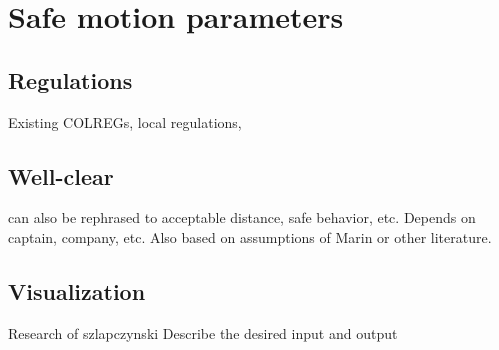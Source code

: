 \chapter{Safe motion parameters}

\section{Regulations}
Existing COLREGs, local regulations, 

\section{Well-clear}
can also be rephrased to acceptable distance, safe behavior, etc.
Depends on captain, company, etc.
Also based on assumptions of Marin or other literature.

\section{Visualization}
Research of szlapczynski
Describe the desired input and output